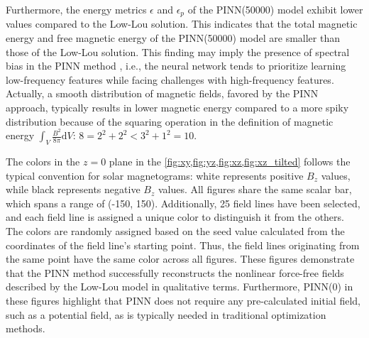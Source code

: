 Furthermore, the energy metrics $\epsilon$ and $\epsilon_p$ of the PINN(50000) model exhibit lower values compared to the Low-Lou solution. This indicates that the total magnetic energy and free magnetic energy of the PINN(50000) model are smaller than those of the Low-Lou solution. This finding may imply the presence of spectral bias in the PINN method \parencite{rahaman2019spectral}, i.e., the neural network tends to prioritize learning low-frequency features while facing challenges with high-frequency features. Actually, a smooth distribution of magnetic fields, favored by the PINN approach, typically results in lower magnetic energy compared to a more spiky distribution because of the squaring operation in the definition of magnetic energy $\int_{V} \frac{B^2}{8\pi} \mathrm{d}V$: $8 = 2^2 + 2^2 < 3^2 + 1^2 = 10$.

The colors in the $z=0$ plane in the \cref{fig:xy,fig:yz,fig:xz,fig:xz_tilted} follows the typical convention for solar magnetograms: white represents positive $B_z$ values, while black represents negative $B_z$ values. All figures share the same scalar bar, which spans a range of (-150, 150). Additionally, 25 field lines have been selected, and each field line is assigned a unique color to distinguish it from the others. The colors are randomly assigned based on the seed value calculated from the coordinates of the field line's starting point. Thus, the field lines originating from the same point have the same color across all figures. These figures demonstrate that the PINN method successfully reconstructs the nonlinear force-free fields described by the Low-Lou model in qualitative terms. Furthermore, PINN(0) in these figures highlight that PINN does not require any pre-calculated initial field, such as a potential field, as is typically needed in traditional optimization methods.

